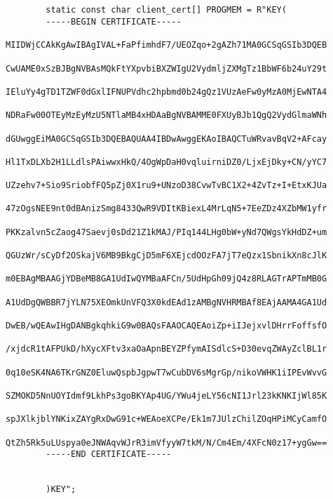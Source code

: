\begin{flushleft}
\begin{lstlisting}[style=CStyle]
		
		
		static const char client_cert[] PROGMEM = R"KEY(
		-----BEGIN CERTIFICATE-----
		MIIDWjCCAkKgAwIBAgIVAL+FaPfimhdF7/UEOZqo+2gAZh71MA0GCSqGSIb3DQEB
		CwUAME0xSzBJBgNVBAsMQkFtYXpvbiBXZWIgU2VydmljZXMgTz1BbWF6b24uY29t
		IEluYy4gTD1TZWF0dGxlIFNUPVdhc2hpbmd0b24gQz1VUzAeFw0yMzA0MjEwNTA4
		NDRaFw00OTEyMzEyMzU5NTlaMB4xHDAaBgNVBAMME0FXUyBJb1QgQ2VydGlmaWNh
		dGUwggEiMA0GCSqGSIb3DQEBAQUAA4IBDwAwggEKAoIBAQCTuWRvavBqV2+AFcay
		Hl1TxDLXb2H1LLdlsPAiwwxHkQ/4OgWpDaH0vqluirniDZ0/LjxEjDky+CN/yYC7
		UZzehv7+Sio9SriobfFQ5pZj0X1ru9+UNzoD38CvwTvBC1X2+4ZvTz+I+EtxKJUa
		47zOgsNEE9nt0dBAnizSmg8433QwR9VDItKBiexL4MrLqN5+7EeZDz4XZbMW1yfr
		PKKzalvn5cZaog47Saevj0sDd21Z1kMAJ/PIq144LHg0bW+yNd7QWgsYkHdDZ+um
		QGUzWr/sCyDf2OSkajV6MB9BkgCjD5mF6XEjcdOOzFA7jT7eQzx1SbnikXn8cJlK
		m0EBAgMBAAGjYDBeMB8GA1UdIwQYMBaAFCn/5UdHpGh09jQ4z8RLAGTrAPTmMB0G
		A1UdDgQWBBR7jYLN75XEOmkUnVFQ3X0kdEAd1zAMBgNVHRMBAf8EAjAAMA4GA1Ud
		DwEB/wQEAwIHgDANBgkqhkiG9w0BAQsFAAOCAQEAoiZp+iIJejxvlDHrrFoffsfO
		/xjdcR1tAFPUkD/hXycXFtv3xaOaApnBEYZPfymAISdlcS+D30evqZWAyZclBL1r
		0q10eSK4NA6TKrGNZ0EluwQspbJgpwT7wCubDV6sMgrGp/nikoVWHK1iIPEvWvvG
		SZMOKD5NnUOYIdmf9LkhPs3goBKYAp4UG/YWu4jeLY56cNI1Jrl23kKNKIjWl85K
		spJXlkjblYNKixZAYgRxDwG91c+WEAoeXCPe/Ek1m7JUlzChilZOqHPiMCyCamfO
		QtZh5Rk5uLUspya0eJNWAqvWJrR3imVfyyW7tkM/N/Cm4Em/4XFcN0z17+ygGw==
		-----END CERTIFICATE-----
		
		
		)KEY";
		
		
		

\end{lstlisting}
\end{flushleft}
